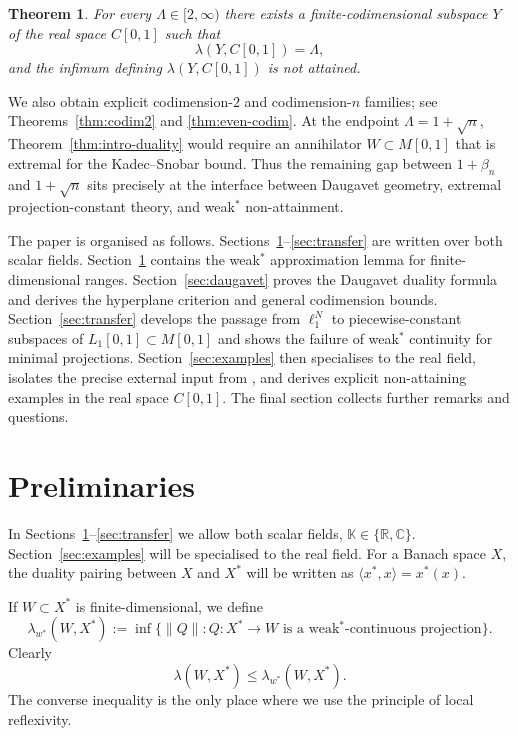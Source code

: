 \documentclass[11pt]{amsart}
\numberwithin{equation}{section}
\newtheorem{theorem}{Theorem}[section]
\theoremstyle{definition}
\theoremstyle{remark}
\newcommand{\R}{\mathbb R}
\newcommand{\C}{\mathbb C}
\newcommand{\K}{\mathbb K}
\newcommand{\wstar}{w^*}
\begin{document}
\begin{theorem}
\label{thm:intro-main}
For every $\Lambda\in[2,\infty)$ there exists a finite-codimensional subspace $Y$ of the real space $C[0,1]$ such that
\[
\lambda(Y,C[0,1])=\Lambda,
\]
and the infimum defining $\lambda(Y,C[0,1])$ is not attained.
\end{theorem}

We also obtain explicit codimension-$2$ and codimension-$n$ families; see Theorems~\ref{thm:codim2} and \ref{thm:even-codim}. At the endpoint $\Lambda=1+\sqrt n$, Theorem~\ref{thm:intro-duality} would require an annihilator $W\subset M[0,1]$ that is extremal for the Kadec--Snobar bound. Thus the remaining gap between $1+\beta_n$ and $1+\sqrt n$ sits precisely at the interface between Daugavet geometry, extremal projection-constant theory, and weak$^*$ non-attainment.

The paper is organised as follows. Sections~\ref{sec:prelim}--\ref{sec:transfer} are written over both scalar fields. Section~\ref{sec:prelim} contains the weak$^*$ approximation lemma for finite-dimensional ranges. Section~\ref{sec:daugavet} proves the Daugavet duality formula and derives the hyperplane criterion and general codimension bounds. Section~\ref{sec:transfer} develops the passage from $\ell_1^N$ to piecewise-constant subspaces of $L_1[0,1]\subset M[0,1]$ and shows the failure of weak$^*$ continuity for minimal projections. Section~\ref{sec:examples} then specialises to the real field, isolates the precise external input from \cite{CL1, LP}, and derives explicit non-attaining examples in the real space $C[0,1]$. The final section collects further remarks and questions.

\section{Preliminaries}
\label{sec:prelim}

In Sections~\ref{sec:prelim}--\ref{sec:transfer} we allow both scalar fields, $\K\in\{\R,\C\}$. Section~\ref{sec:examples} will be specialised to the real field. For a Banach space $X$, the duality pairing between $X$ and $X^*$ will be written as $\langle x^*,x\rangle=x^*(x)$.

If $W\subset X^*$ is finite-dimensional, we define
\[
\lambda_{\wstar}(W,X^*)
:=
\inf\{\|Q\|: Q\colon X^*\to W\text{ is a weak$^*$-continuous projection}\}.
\]
Clearly
\[
\lambda(W,X^*)\leqslant \lambda_{\wstar}(W,X^*).
\]
The converse inequality is the only place where we use the principle of local reflexivity.
\end{document}
